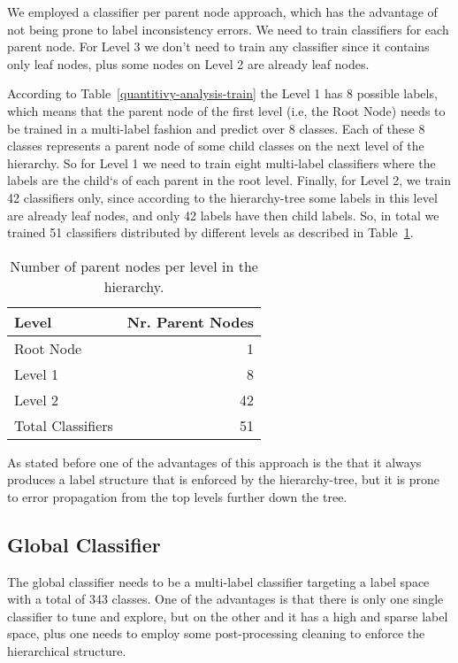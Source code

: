 \documentclass[11pt,a4paper]{article}
\begin{document}
We employed a classifier per parent node approach, which has the advantage of
not being prone to label inconsistency errors. We need to train classifiers for
each parent node. For Level 3 we don't need to train any classifier since it
contains only leaf nodes, plus some nodes on Level 2 are already leaf nodes.

According to Table~\ref{quantitivy-analysis-train} the Level 1 has 8 possible
labels, which means that the parent node of the first level (i.e, the Root Node)
needs to be trained in a multi-label fashion and predict over 8 classes. Each of
these 8 classes represents a parent node of some child classes on the
next level of the hierarchy. So for Level 1 we need to train eight multi-label
classifiers where the labels are the child`s of each parent in the root level.
Finally, for Level 2, we train 42 classifiers only, since according to the
hierarchy-tree some labels in this level are already leaf nodes, and only 42
labels have then child labels. So, in total we trained 51 classifiers
distributed by different levels as described in Table~\ref{parent-per-node-classifiers}.

\begin{table}[!h]
\begin{center}
\begin{tabular}{|l|r|}
\hline\centering\textbf{Level}  &  \textbf{Nr. Parent Nodes}    \\
\hline
Root Node         &  1       \\
Level 1           &  8       \\
Level 2           &  42      \\
\hline
Total Classifiers & 51       \\
\hline
\end{tabular}
\end{center}
\caption{\label{parent-per-node-classifiers}Number of parent nodes per level in
the hierarchy.}
\end{table}

As stated before one of the advantages of this approach is the that it always
produces a label structure that is enforced by the hierarchy-tree, but it is
prone to error propagation from the top levels further down the tree.


\subsection{Global Classifier}

The global classifier needs to be a multi-label classifier targeting a label
space with a total of 343 classes. One of the advantages is that there is only
one single classifier to tune and explore, but on the other and it has a high
and sparse label space, plus one needs to employ some post-processing cleaning
to enforce the hierarchical structure.
\end{document}
